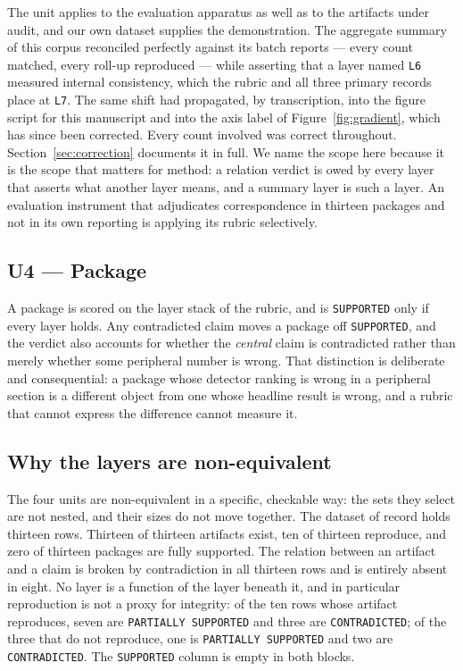 \documentclass[sigconf,review]{acmart}
\begin{document}
The unit applies to the evaluation apparatus as well as to the artifacts under
audit, and our own dataset supplies the demonstration. The aggregate summary
of this corpus reconciled perfectly against its batch reports --- every count
matched, every roll-up reproduced --- while asserting that a layer named
\texttt{L6} measured internal consistency, which the rubric and all three
primary records place at \texttt{L7}. The same shift had propagated, by transcription, into the figure
script for this manuscript and into the axis label of
Figure~\ref{fig:gradient}, which has since been corrected. Every count
involved was correct throughout.
Section~\ref{sec:correction} documents it in full.
We name the scope here because it is the scope that matters for method: a
relation verdict is owed by every layer that asserts what another layer means,
and a summary layer is such a layer. An evaluation instrument that adjudicates
correspondence in thirteen packages and not in its own reporting is applying
its rubric selectively.

\subsection{U4 --- Package}
\label{sec:model-package}

A package is scored on the layer stack of the rubric, and is
\texttt{SUPPORTED} only if every layer holds. Any contradicted claim moves a
package off \texttt{SUPPORTED}, and the verdict also accounts for whether the
\emph{central} claim is contradicted rather than merely whether some
peripheral number is wrong. That distinction is deliberate and consequential:
a package whose detector ranking is wrong in a peripheral section is a
different object from one whose headline result is wrong, and a rubric that
cannot express the difference cannot measure it.

\subsection{Why the layers are non-equivalent}
\label{sec:model-neq}

The four units are non-equivalent in a specific, checkable way: the sets they
select are not nested, and their sizes do not move together. The dataset of
record holds thirteen rows. Thirteen of thirteen artifacts exist, ten of
thirteen reproduce, and zero of thirteen packages are fully supported. The
relation between an artifact and a claim is broken by contradiction in all
thirteen rows and is entirely absent in eight. No layer is a function of the
layer beneath it, and in particular reproduction is not a proxy for integrity:
of the ten rows whose artifact reproduces, seven are \texttt{PARTIALLY
SUPPORTED} and three are \texttt{CONTRADICTED}; of the three that do not
reproduce, one is \texttt{PARTIALLY SUPPORTED} and two are
\texttt{CONTRADICTED}. The \texttt{SUPPORTED} column is empty in both
blocks.
\end{document}
